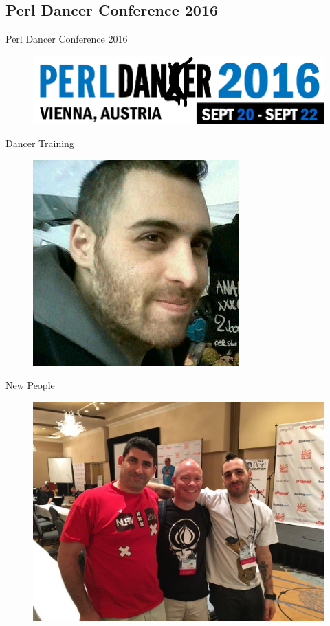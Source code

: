 \subsection{Perl Dancer Conference 2016}
\begin{frame}{Perl Dancer Conference 2016}
\begin{figure}[!ht]
\centering
\includegraphics[width=1\linewidth]{img/perl-dancer-homepage-logo-2016.png}
\end{figure}
\end{frame}

\begin{frame}{Dancer Training}
\begin{figure}[!ht]
\centering
\includegraphics[width=0.6\linewidth]{img/sawyer.png}
\end{figure}
\end{frame}

\begin{frame}{New People}
\begin{figure}[!ht]
\centering
\includegraphics[width=1\linewidth]{img/crowd.png}
\end{figure}
\end{frame}

